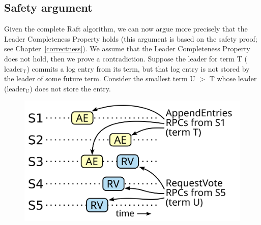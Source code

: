 \subsection{Safety argument}
\label{basicraft:safety:argument}

\newcommand\leaderT{$\textrm{leader}_\textrm{T}$}
\newcommand\leaderU{$\textrm{leader}_\textrm{U}$}

Given the complete Raft algorithm, we can now argue
more precisely that the Leader Completeness Property holds
(this argument is based on the safety proof; see
Chapter~\ref{correctness}).
We assume that the Leader Completeness Property
does not hold, then we prove a contradiction.
Suppose the leader for term T (\leaderT{}) commits a log entry from
its term, but that log entry is not stored by the leader of some
future term. Consider the smallest term U $>$ T whose leader (\leaderU{})
does not store the entry.

\begin{figure}
\centering
\includegraphics[scale=.50]{basicraft/safety2}
\label{fig:basicraft:safety2}
\end{figure}


